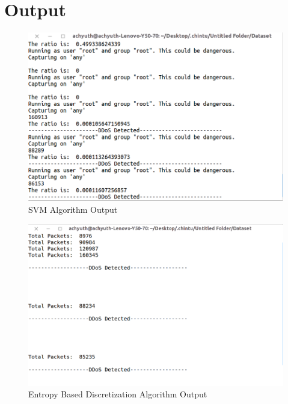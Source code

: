 \documentclass[12pt,a4paper,final]{report}
\begin{document}
\newpage

\section{Output}

\begin{figure}[h]
\centering
\includegraphics[scale=0.4]{SVMOutput.png}
\caption{SVM Algorithm Output}
\end{figure}


\begin{figure}[h]
\centering
\includegraphics[scale=0.4]{EBDOutput.png}
\caption{Entropy Based Discretization Algorithm Output}
\end{figure}
\end{document}
